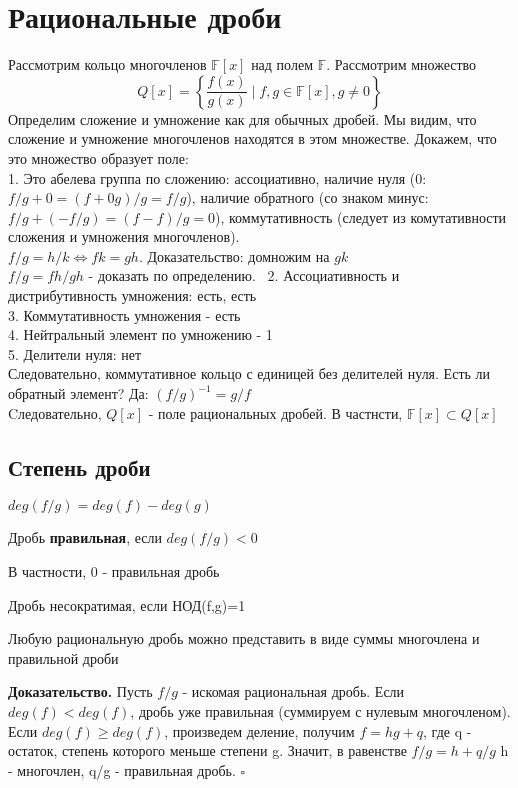 \section{Рациональные дроби}
Рассмотрим кольцо многочленов $\mathbb F[x]$ над полем $\mathbb F$. 
Рассмотрим множество $$Q[x]=\left\{\frac{f(x)}{g(x)}\mid f,g\in\mathbb F[x],
g\ne0\right\}$$
Определим сложение и умножение как для обычных дробей. Мы видим, что сложение
и умножение многочленов находятся в этом множестве. Докажем, что это
множество образует поле: \\
1. Это абелева группа по сложению: ассоциативно, наличие нуля
(0: $f/g+0=(f+0g)/g=f/g$), наличие обратного (со знаком минус:
$f/g+(-f/g)=(f-f)/g=0$),
коммутативность (следует из комутативности сложения и умножения многочленов).\\
$f/g=h/k \Leftrightarrow fk=gh$. Доказательство: домножим на $gk$\\
$f/g=fh/gh$ - доказать по определению. \
2. Ассоциативность и дистрибутивность умножения: есть, есть \\
3. Коммутативность умножения - есть\\
4. Нейтральный элемент по умножению - 1\\
5. Делители нуля: нет\\
Следовательно, коммутативное кольцо с единицей без делителей нуля. Есть ли 
обратный элемент? Да: $(f/g)^{-1}=g/f$\\
Cледовательно, $Q[x]$ - поле рациональных дробей. В частнсти,
$\mathbb F[x]\subset Q[x]$
\subsection{Степень дроби}
\begin{defin}
$deg(f/g)=deg(f)-deg(g)$
\end{defin}
\begin{defin}
Дробь \textbf{правильная}, если $deg(f/g)<0$
\end{defin}
В частности, 0 - правильная дробь
\begin{defin}
Дробь несократимая, если НОД(f,g)=1
\end{defin}
\begin{theor}
Любую рациональную дробь можно представить в виде суммы многочлена и
правильной дроби
\end{theor}
\textbf{Доказательство.} Пусть $f/g$ - искомая рациональная дробь. 
Если $deg(f)<deg(f)$, дробь уже правильная (суммируем с нулевым многочленом).
Если $deg(f)\geqslant deg(f)$, произведем деление, получим $f=hg+q$, 
где q - остаток, степень которого меньше степени g. Значит, в равенстве
$f/g=h+q/g$ h - многочлен, q/g - правильная дробь. $\square$\\

